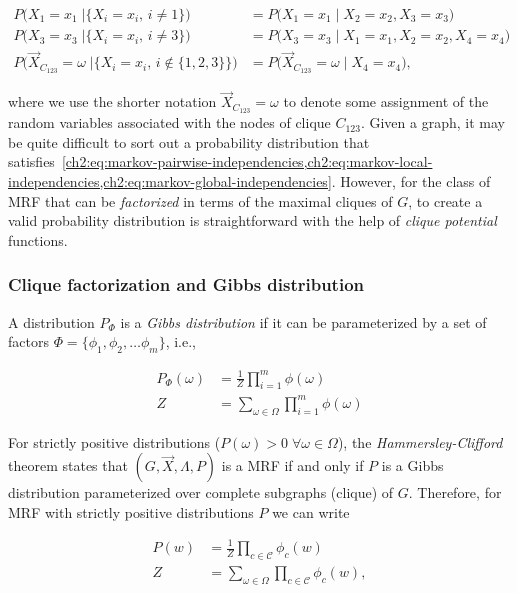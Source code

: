 \begin{align*}
		P\Big(X_1=x_1 \; | \big\{X_i=x_i, \, i \neq 1 \big\} \Big) &= P\Big(X_1=x_1 \; | \; X_2=x_2,X_3=x_3 \Big) \\
		P\Big(X_3=x_3 \; | \big\{X_i=x_i, \, i \neq 3 \big\} \Big) &= P\Big(X_3=x_3 \; | \; X_1=x_1,X_2=x_2, X_4=x_4 \Big) \\
		P\Big(\vec{X}_{C_{123}} =\omega \; | \big\{X_i=x_i, \, i \notin \{1,2,3\}  \big\} \Big) &= P\Big(\vec{X}_{C_{123}} = \omega \; | \; X_4=x_4 \Big),		
\end{align*}

where we use the shorter notation $\vec{X}_{C_{123}} =\omega$ to denote some assignment of the random variables associated with the nodes of clique $C_{123}$. Given a graph, it may be quite difficult to sort out a probability distribution that satisfies~\cref{ch2:eq:markov-pairwise-independencies,ch2:eq:markov-local-independencies,ch2:eq:markov-global-independencies}. However, for the class of MRF that can be \emph{factorized} in terms of the maximal cliques of $G$, to create a valid probability distribution is straightforward with the help of \emph{clique potential} functions.

\subsubsection{Clique factorization and Gibbs distribution}

A distribution $P_{\Phi}$ is a \emph{Gibbs distribution} if it can be parameterized by a set of factors $\Phi = \{\phi_1,\phi_2,\dots \phi_m\}$, i.e., 

\begin{align*}
	P_{\Phi}(\omega) &= \frac{1}{Z}\prod_{i=1}^{m}{\phi(\omega)} \\
	Z &= \sum_{\omega \in \Omega}{ \prod_{i=1}^{m}{\phi(\omega)} }
\end{align*}


For strictly positive distributions ($P(\omega) > 0\; \forall \omega \in \Omega$), the \emph{Hammersley-Clifford} theorem states that $(G,\vec{X},\Lambda,P)$ is a MRF if and only if $P$ is a Gibbs distribution parameterized over complete subgraphs (clique) of $G$. Therefore, for MRF with strictly positive distributions $P$ we can write 

\begin{align*}
	P(w) &= \frac{1}{Z}\prod_{c \in \mathcal{C}}{\phi_c(w)} \\
	Z &=  \sum_{\omega \in \Omega}{ \prod_{c \in \mathcal{C}}{\phi_c(w)} },
\end{align*}

